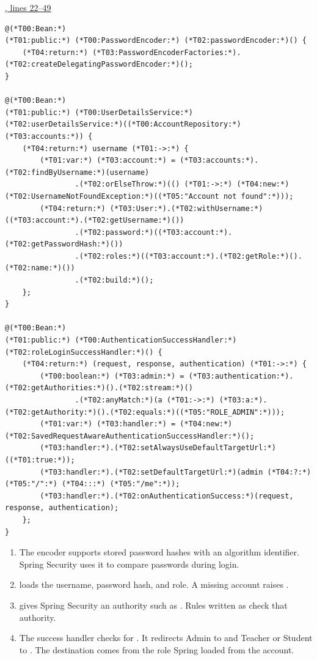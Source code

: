 \par\smallskip
{\small\href{\repo/blob/5d22aed7f6d4ef1e4c0b0c0dabf2962ba4b47608/src/main/java/com/example/fmschool/config/SecurityConfig.java#L22-L49}{, lines 22--49}}
\begin{lstlisting}[style=vsJava,firstnumber=22]
@(*T00:Bean:*)
(*T01:public:*) (*T00:PasswordEncoder:*) (*T02:passwordEncoder:*)() {
    (*T04:return:*) (*T03:PasswordEncoderFactories:*).(*T02:createDelegatingPasswordEncoder:*)();
}

@(*T00:Bean:*)
(*T01:public:*) (*T00:UserDetailsService:*) (*T02:userDetailsService:*)((*T00:AccountRepository:*) (*T03:accounts:*)) {
    (*T04:return:*) username (*T01:->:*) {
        (*T01:var:*) (*T03:account:*) = (*T03:accounts:*).(*T02:findByUsername:*)(username)
                .(*T02:orElseThrow:*)(() (*T01:->:*) (*T04:new:*) (*T02:UsernameNotFoundException:*)((*T05:"Account not found":*)));
        (*T04:return:*) (*T03:User:*).(*T02:withUsername:*)((*T03:account:*).(*T02:getUsername:*)())
                .(*T02:password:*)((*T03:account:*).(*T02:getPasswordHash:*)())
                .(*T02:roles:*)((*T03:account:*).(*T02:getRole:*)().(*T02:name:*)())
                .(*T02:build:*)();
    };
}

@(*T00:Bean:*)
(*T01:public:*) (*T00:AuthenticationSuccessHandler:*) (*T02:roleLoginSuccessHandler:*)() {
    (*T04:return:*) (request, response, authentication) (*T01:->:*) {
        (*T00:boolean:*) (*T03:admin:*) = (*T03:authentication:*).(*T02:getAuthorities:*)().(*T02:stream:*)()
                .(*T02:anyMatch:*)(a (*T01:->:*) (*T03:a:*).(*T02:getAuthority:*)().(*T02:equals:*)((*T05:"ROLE_ADMIN":*)));
        (*T01:var:*) (*T03:handler:*) = (*T04:new:*) (*T02:SavedRequestAwareAuthenticationSuccessHandler:*)();
        (*T03:handler:*).(*T02:setAlwaysUseDefaultTargetUrl:*)((*T01:true:*));
        (*T03:handler:*).(*T02:setDefaultTargetUrl:*)(admin (*T04:?:*) (*T05:"/":*) (*T04:::*) (*T05:"/me":*));
        (*T03:handler:*).(*T02:onAuthenticationSuccess:*)(request, response, authentication);
    };
}
\end{lstlisting}


\begin{enumerate}
\item The encoder supports stored password hashes with an algorithm identifier.
Spring Security uses it to compare passwords during login.
\item {} loads the username, password hash, and role.
A missing account raises .
\item {} gives Spring Security an authority such as
. Rules written as  check that authority.
\item The success handler checks for . It redirects Admin to
\code{/} and Teacher or Student to . The destination comes from the role
Spring loaded from the account.
\end{enumerate}

